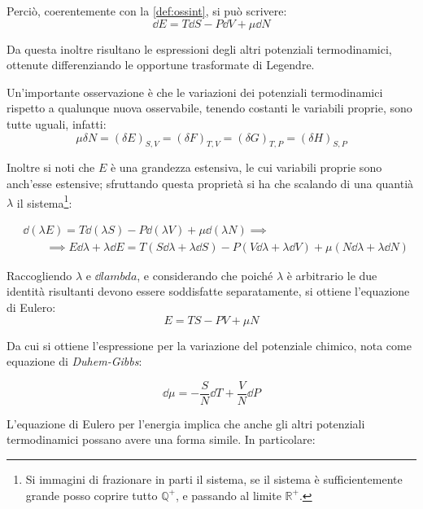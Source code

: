 Perciò, coerentemente con la \cref{def:ossint}, si può scrivere:
\begin{equation*}
\dd E = T \dd S - P \dd V + \mu \dd N
\end{equation*}

\noindent Da questa inoltre risultano le espressioni degli altri potenziali termodinamici, ottenute differenziando le opportune trasformate di Legendre.

\begin{note}
	Un'importante osservazione è che le variazioni dei potenziali termodinamici rispetto a qualunque nuova osservabile, tenendo costanti le variabili proprie, sono tutte uguali, infatti:
	\begin{equation*}
	\mu \delta N = (\delta E)_{S, V} = (\delta F)_{T,V} = (\delta G)_{T,P} = (\delta H)_{S,P}
	\end{equation*}
\end{note}

Inoltre si noti che $E$ è una grandezza estensiva, le cui variabili proprie sono anch'esse estensive; sfruttando questa proprietà si ha che scalando di una quantià $\lambda$ il sistema\footnote{Si immagini di frazionare in parti il sistema, se il sistema è sufficientemente grande posso coprire tutto $\mathbb{Q}^+$, e passando al limite $\mathbb{R}^+$.}:

\begin{align*}
& \dd (\lambda E) = T \dd (\lambda S) - P \dd (\lambda V) + \mu \dd (\lambda N) \implies\\ 
& \qquad \implies E \dd \lambda + \lambda \dd E  = T (S \dd \lambda + \lambda \dd S) - P (V \dd \lambda + \lambda \dd V) + \mu (N\dd \lambda + \lambda \dd N)
\end{align*}

Raccogliendo $\lambda$ e $\dd lambda$, e considerando che poiché $\lambda$ è arbitrario le due identità risultanti devono essere soddisfatte separatamente, si ottiene l'equazione di Eulero:
\begin{equation*}
E = TS - PV + \mu N
\end{equation*}

Da cui si ottiene l'espressione per la variazione del potenziale chimico, nota come equazione di \textit{Duhem-Gibbs}:

\begin{equation*}
\dd \mu = - \frac{S}{N} \dd T + \frac{V}{N} \dd P
\end{equation*}

L'equazione di Eulero per l'energia implica che anche gli altri potenziali termodinamici possano avere una forma simile. In particolare:

